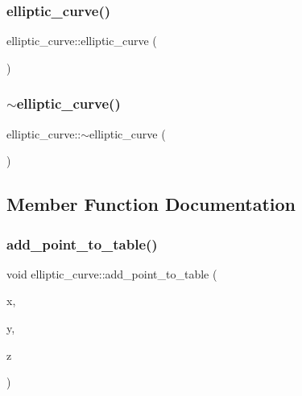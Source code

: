 \subsubsection{\texorpdfstring{elliptic\+\_\+curve()}{elliptic\_curve()}}
{\footnotesize\ttfamily elliptic\+\_\+curve\+::elliptic\+\_\+curve (\begin{DoxyParamCaption}{ }\end{DoxyParamCaption})}

\mbox{\label{classelliptic__curve_a087cbee00624368ff64a68ce7100b09f}} 
\subsubsection{\texorpdfstring{$\sim$elliptic\+\_\+curve()}{~elliptic\_curve()}}
{\footnotesize\ttfamily elliptic\+\_\+curve\+::$\sim$elliptic\+\_\+curve (\begin{DoxyParamCaption}{ }\end{DoxyParamCaption})}



\subsection{Member Function Documentation}
\mbox{\label{classelliptic__curve_a2690f776fb20537f5bab2235cdb13f1a}} 
\subsubsection{\texorpdfstring{add\+\_\+point\+\_\+to\+\_\+table()}{add\_point\_to\_table()}}
{\footnotesize\ttfamily void elliptic\+\_\+curve\+::add\+\_\+point\+\_\+to\+\_\+table (\begin{DoxyParamCaption}\item[{\mbox{\hyperlink{galois_8h_a09fddde158a3a20bd2dcadb609de11dc}{I\+NT}}}]{x,  }\item[{\mbox{\hyperlink{galois_8h_a09fddde158a3a20bd2dcadb609de11dc}{I\+NT}}}]{y,  }\item[{\mbox{\hyperlink{galois_8h_a09fddde158a3a20bd2dcadb609de11dc}{I\+NT}}}]{z }\end{DoxyParamCaption})}

